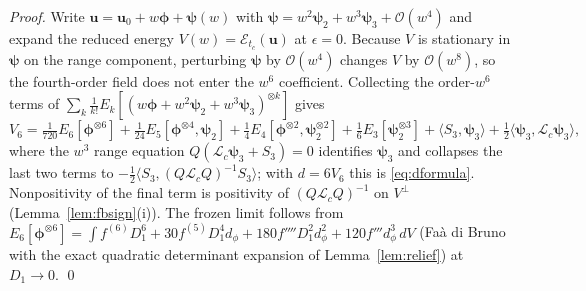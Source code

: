 \begin{proof}
    Write $\bm u=\bm u_0+w\bm\phi+\bm\psi(w)$ with $\bm\psi=w^2\bm\psi_2+w^3\bm\psi_3+\mathcal O(w^4)$ and expand the
    reduced energy $V(w)=\mathcal E_{t_c}(\bm u)$ at $\epsilon=0$. Because $V$ is stationary in $\bm\psi$ on the range
    component, perturbing $\bm\psi$ by $\mathcal O(w^4)$ changes $V$ by $\mathcal O(w^8)$, so the fourth-order field
    does not enter the $w^6$ coefficient. Collecting the order-$w^6$ terms of $\sum_k\tfrac1{k!}E_k[(w\bm\phi+
    w^2\bm\psi_2+w^3\bm\psi_3)^{\otimes k}]$ gives
    \[
        V_6=\tfrac1{720}E_6[\bm\phi^{\otimes6}]+\tfrac1{24}E_5[\bm\phi^{\otimes4},\bm\psi_2]
        +\tfrac14E_4[\bm\phi^{\otimes2},\bm\psi_2^{\otimes2}]+\tfrac16E_3[\bm\psi_2^{\otimes3}]
        +\langle S_3,\bm\psi_3\rangle+\tfrac12\langle\bm\psi_3,\mathcal{L}_c\bm\psi_3\rangle ,
    \]
    where the $w^3$ range equation $Q(\mathcal{L}_c\bm\psi_3+S_3)=0$ identifies $\bm\psi_3$ and collapses the last
    two terms to $-\tfrac12\langle S_3,(Q\mathcal{L}_cQ)^{-1}S_3\rangle$; with $d=6V_6$ this is \eqref{eq:dformula}.
    Nonpositivity of the final term is positivity of $(Q\mathcal{L}_cQ)^{-1}$ on $V^\perp$ (Lemma~\ref{lem:fbsign}(i)).
    The frozen limit follows from $E_6[\bm\phi^{\otimes6}]=\int f^{(6)}D_1^6+30f^{(5)}D_1^4d_\phi
    +180f''''D_1^2d_\phi^2+120f'''d_\phi^3\,dV$ (Fa\`a di Bruno with the exact quadratic determinant expansion of
    Lemma~\ref{lem:relief}) at $D_1\to0$. \qed
\end{proof}

